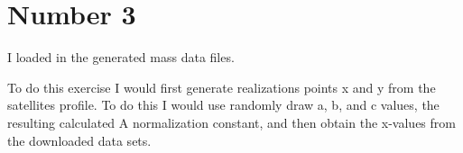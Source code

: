 \section{Number 3}

I loaded in the generated mass data files.

To do this exercise I would first generate realizations points x and y from the satellites profile. To do this I would use randomly draw a, b, and c values, the resulting calculated A normalization constant, and then obtain the x-values from the downloaded data sets.


